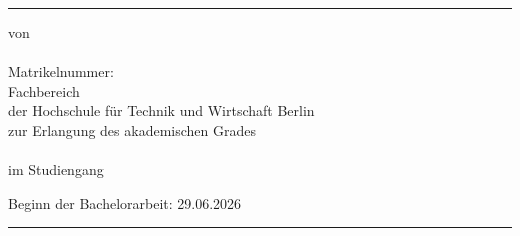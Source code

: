 {      \textcolor{HKS66}{\rule{\linewidth}{.4mm}}
      \begin{center}
        \begin{hsheadfont}
          \textcolor{\headcolor}{\LARGE \textbf{\thetitel}}
        \end{hsheadfont}
      \end{center}
      \begin{hsheadfont}
        \begin{center}
          \textbf{\Large{\thethesistyp}}
        \end{center}
      \end{hsheadfont}
      \begin{center}
        \begin{hsfont}
          von\\[2ex]
          {\textbf{\large\theautor}}\\[2ex]
          Matrikelnummer: \thematrikelnr\\[2ex]
          Fachbereich \thefachbereich\\
          der Hochschule für Technik und Wirtschaft Berlin\\[2ex]
          zur Erlangung des akademischen Grades\\
          \textbf{\theabschluss}\\
          im Studiengang\\
          \textbf{\thestudiengang}
        \end{hsfont}
      \end{center}
     
       \begin{center}
         Beginn der Bachelorarbeit: 29.06.2026 %
       \end{center}
         
      
      \thebetreuerFeld
      

      \textcolor{HKS66}{\rule{\linewidth}{0.4mm}}\\[1.5ex]
       \begin{hsheadfont}
         ~\hfill~
       \end{hsheadfont}
    }
    
